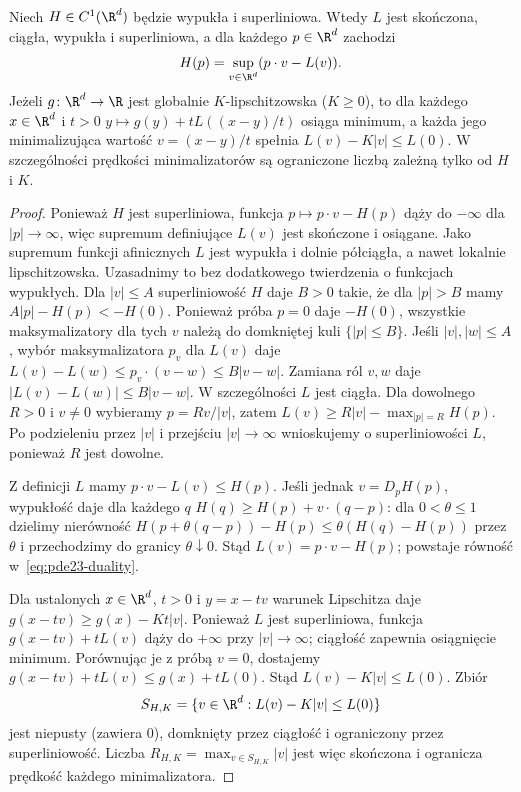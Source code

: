 \begin{lemat}
\label{lem:pde23-legendre}
Niech $H\in C^1(\R^d)$ będzie wypukła i superliniowa.
Wtedy $L$ jest skończona, ciągła, wypukła i superliniowa,
a dla każdego $p\in\R^d$ zachodzi
\begin{equation}\label{eq:pde23-duality}
 H(p)=\sup_{v\in\R^d}(p\cdot v-L(v)).
\end{equation}
Jeżeli $g\colon\R^d\to\R$ jest globalnie
$K$-lipschitzowska ($K\ge0$), to dla każdego
$x\in\R^d$ i $t>0$
$y\mapsto g(y)+tL((x-y)/t)$ osiąga minimum, a każda
jego minimalizująca wartość $v=(x-y)/t$ spełnia
$L(v)-K|v|\le L(0)$. W szczególności prędkości
minimalizatorów są ograniczone liczbą zależną tylko od
$H$ i $K$.
\end{lemat}
\begin{proof}
Ponieważ $H$ jest superliniowa, funkcja
$p\mapsto p\cdot v-H(p)$ dąży do $-\infty$ dla
$|p|\to\infty$, więc supremum definiujące $L(v)$
jest skończone i osiągane. Jako supremum funkcji
afinicznych $L$ jest wypukła i dolnie półciągła,
a nawet lokalnie lipschitzowska. Uzasadnimy to
bez dodatkowego twierdzenia o funkcjach wypukłych.
Dla $|v|\le A$ superliniowość $H$ daje $B>0$
takie, że dla $|p|>B$ mamy
$A|p|-H(p)<-H(0)$. Ponieważ próba $p=0$
daje $-H(0)$, wszystkie maksymalizatory
dla tych $v$ należą do domkniętej kuli
$\{|p|\le B\}$. Jeśli $|v|,|w|\le A$,
wybór maksymalizatora $p_v$ dla $L(v)$ daje
$L(v)-L(w)\le p_v\cdot(v-w)\le B|v-w|$.
Zamiana ról $v,w$ daje
$|L(v)-L(w)|\le B|v-w|$.
W szczególności $L$ jest ciągła.
Dla dowolnego $R>0$ i $v\ne0$ wybieramy
$p=R v/|v|$, zatem $L(v)\ge R|v|-\max_{|p|=R}H(p)$.
Po podzieleniu przez $|v|$ i przejściu $|v|\to\infty$
wnioskujemy o superliniowości $L$, ponieważ $R$ jest
dowolne.

Z definicji $L$ mamy $p\cdot v-L(v)\le H(p)$.
Jeśli jednak $v=D_pH(p)$, wypukłość daje dla każdego $q$
$H(q)\ge H(p)+v\cdot(q-p)$:
dla $0<\theta\le1$ dzielimy nierówność
$H(p+\theta(q-p))-H(p)\le\theta(H(q)-H(p))$
przez $\theta$ i przechodzimy do granicy
$\theta\downarrow0$. Stąd
$L(v)=p\cdot v-H(p)$; powstaje równość w~\eqref{eq:pde23-duality}.

Dla ustalonych $x\in\R^d$, $t>0$ i $y=x-tv$ warunek Lipschitza
daje $g(x-tv)\ge g(x)-Kt|v|$. Ponieważ $L$ jest
superliniowa, funkcja $g(x-tv)+tL(v)$ dąży do
$+\infty$ przy $|v|\to\infty$; ciągłość zapewnia
osiągnięcie minimum. Porównując je z próbą $v=0$,
dostajemy
$g(x-tv)+tL(v)\le g(x)+tL(0)$.
Stąd $L(v)-K|v|\le L(0)$.
Zbiór
\[
 S_{H,K}=\{v\in\R^d:L(v)-K|v|\le L(0)\}
\]
jest niepusty (zawiera $0$), domknięty przez
ciągłość i ograniczony przez superliniowość.
Liczba $R_{H,K}=\max_{v\in S_{H,K}}|v|$ jest więc
skończona i ogranicza prędkość każdego minimalizatora.
\end{proof}

